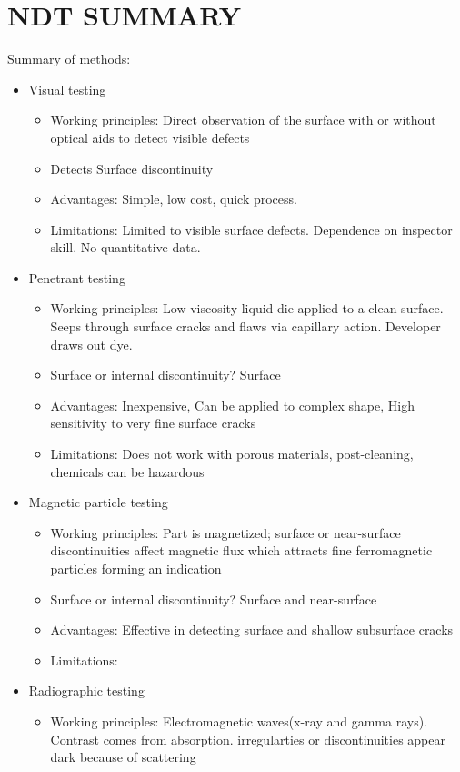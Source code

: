 \documentclass[11pt]{article}
\begin{document}
\section{NDT SUMMARY}
Summary of methods:
\begin{itemize}
    \item Visual testing
    \begin{itemize}
        \item Working principles: Direct observation of the surface with or without optical aids to detect visible defects
        \item Detects Surface discontinuity
        \item Advantages: Simple, low cost, quick process.
        \item Limitations: Limited to visible surface defects. Dependence on inspector skill. No quantitative data.
    \end{itemize}
    \item Penetrant testing
    \begin{itemize}
        \item Working principles: Low-viscosity liquid die applied to a clean surface. Seeps through surface cracks and flaws via capillary action. Developer draws out dye.
        \item Surface or internal discontinuity? Surface 
        \item Advantages: Inexpensive, Can be applied to complex shape, High sensitivity to very fine surface cracks
        \item Limitations: Does not work with porous materials, post-cleaning, chemicals can be hazardous 
    \end{itemize}
    \item Magnetic particle testing
    \begin{itemize}
        \item Working principles: Part is magnetized; surface or near-surface discontinuities affect magnetic flux which attracts fine ferromagnetic particles forming an indication
        \item Surface or internal discontinuity? Surface and near-surface
        \item Advantages: Effective in detecting surface and shallow subsurface cracks
        \item Limitations: 
    \end{itemize}
    \item Radiographic testing
    \begin{itemize}
        \item Working principles: Electromagnetic waves(x-ray and gamma rays). Contrast comes from absorption. irregularties or discontinuities appear dark because of scattering

\end{itemize}
\end{itemize}
\end{document}
